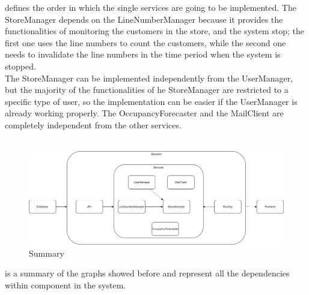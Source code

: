  defines the order in which the single services are going to be implemented.
The StoreManager depends on the LineNumberManager because it provides the functionalities of monitoring the customers in the store, and the
system stop;
the first one uses the line numbers to count the customers, while the second one needs to invalidate the line numbers
in the time period when the system is stopped.\\
The StoreManager can be implemented independently from the UserManager, but the majority of the functionalities of he StoreManager
are restricted to a specific type of user, so the implementation can be easier if the UserManager is already working properly.
The OccupancyForecaster and the MailClient are completely independent from the other services.\\
\\
\begin{figure}[H]
    \centering
    \includegraphics[height=0.4\textwidth]{Images/IntegrationAndTestingPlan/Summary.png}
    \caption{Summary}
    \label{fig:Summary}
\end{figure}
 is a summary of the graphs showed before and represent all the dependencies within component in the system.




